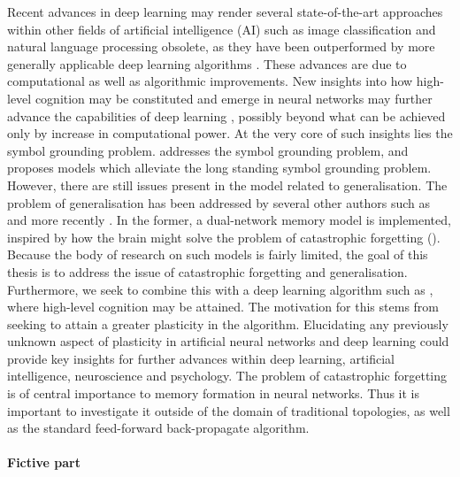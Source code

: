 Recent advances in deep learning may render several state-of-the-art approaches within other fields of artificial intelligence (AI) such as image classification and natural language processing obsolete, as they have been outperformed by more generally applicable deep learning algorithms \cite{LeCun2015, Schmidhuber2014}.  These advances are due to computational as well as algorithmic improvements. New insights into how high-level cognition may be constituted and emerge in neural networks may further advance the capabilities of deep learning \cite{Tani2014}, possibly beyond what can be achieved only by increase in computational power. At the very core of such insights lies the symbol grounding problem. \cite{Tani2014} addresses the symbol grounding problem, and proposes models which alleviate the long standing symbol grounding problem. However, there are still issues present in the model related to generalisation. The problem of generalisation has been addressed by several other authors such as \cite{McClelland1995} and more recently \cite{Hattori2014}. In the former, a dual-network memory model is implemented, inspired by how the brain might solve the problem of catastrophic forgetting (\cite{McCloskey1989, French1992}). Because the body of research on such models is fairly limited, the goal of this thesis is to address the issue of catastrophic forgetting and generalisation. Furthermore, we seek to combine this with a deep learning algorithm such as \cite{Tani2014}, where high-level cognition may be attained. The motivation for this stems from seeking to attain a greater plasticity in the algorithm. Elucidating any previously unknown aspect of plasticity in artificial neural networks and deep learning could provide key insights for further advances within deep learning, artificial intelligence, neuroscience and psychology. The problem of catastrophic forgetting is of central importance to memory formation in neural networks. Thus it is important to investigate it outside of the domain of traditional topologies, as well as the standard feed-forward back-propagate algorithm.
\\\\
\textbf{Fictive part}
\\
